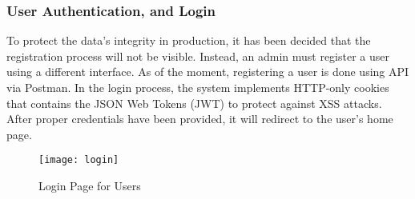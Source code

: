 \subsubsection{User Authentication, and Login}
To protect the data's integrity in production, it has been decided that the registration process will not be visible. Instead, an admin must register a user using a different interface. As of the moment, registering a user is done using API via Postman. In the login process, the system implements HTTP-only cookies that contains the JSON Web Tokens (JWT) to protect against XSS attacks. After proper credentials have been provided, it will redirect to the user's home page.
\begin{figure}[H]
	\centering
	\texttt{[image: login]}
	\caption{Login Page for Users}
	\label{fig:login_page}
\end{figure}

